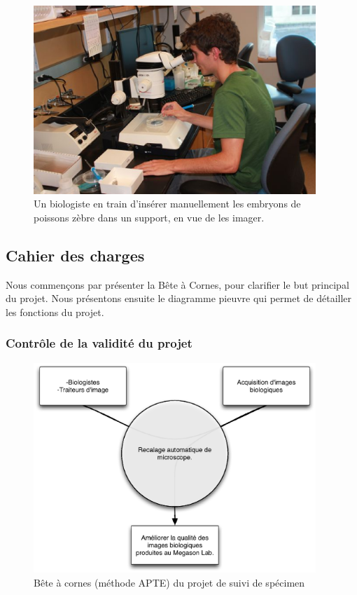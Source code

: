 \begin{figure}[h]
\begin{center}
\leavevmode
\includegraphics[width=0.95\textwidth]{pictures/PICmounting}
\end{center}
\caption{Un biologiste en train d'insérer manuellement les embryons de poissons zèbre dans un support, en vue de les imager.}
\label{fig:PICMounting}
\end{figure}

\subsection{Cahier des charges}
Nous commençons par présenter la Bête à Cornes,
pour clarifier le but principal du projet. Nous présentons ensuite le diagramme pieuvre qui permet de détailler les fonctions du projet.

\subsubsection{Contrôle de la validité du projet}
\begin{figure}[h]
\begin{center}
\leavevmode
\includegraphics[width=0.95\textwidth]{pictures/RecalBAC}
\end{center}
\caption{Bête à cornes (méthode {APTE\textregistered}) du projet de suivi de spécimen}
\label{fig:BACRecal}
\end{figure}

